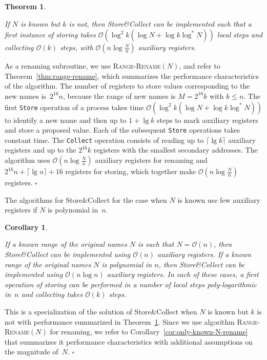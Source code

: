 \documentclass[11pt]{article}
\newcommand{\cO}{\mathcal{O}}
\newcommand{\qed}{\hfill $\square$ \smallbreak}
\newenvironment{proof}{\noindent{\bf Proof:}}{\qed}
\newtheorem{theorem}{Theorem}
\newtheorem{corollary}{Corollary}
\begin{document}
\begin{theorem}
\label{thm:collect-only-N-known}

If $N$ is known but $k$ is not, then Store\&Collect can be implemented such that a first instance of storing takes $\cO(\log^2 k (\log N + \log k\log^\ast N))$ local steps and collecting $\cO(k)$ steps, with $\cO(n\log\frac{N}{n})$ auxiliary registers.
\end{theorem}

\begin{proof}
As a renaming subroutine, we use  \textsc{Range-Rename}$(N)$, and refer to Theorem~\ref{thm:range-rename}, which summarizes the performance characteristics of the algorithm. 
The number of registers to store values corresponding to the new names is~$2^{16}n$, because the range of new names is $M=2^{16}k$ with $k\le n$.
The first \texttt{Store} operation of a process takes time $\cO(\log^2 k (\log N + \log k\log^\ast N))$ to identify a new name and then up to $1+\lg k$ steps to mark auxiliary registers and store a proposed value.
Each of the subsequent \texttt{Store} operations takes constant time.
The \texttt{Collect} operation consists of reading up to $\lceil \lg k\rceil$ auxiliary registers and up to the $2^{16} k$ registers with the smallest secondary addresses.
The algorithm uses $\cO(n\log\frac{N}{n})$ auxiliary registers for renaming and $2^{16} n + \lceil \lg n\rceil+16$ registers for storing, which together make $\cO(n\log\frac{N}{n})$ registers.
\end{proof}

The  algorithms for Store\&Collect for the case when $N$ is known use few auxiliary registers if $N$ is  polynomial in~$n$.



\begin{corollary}
\label{cor:store-collect-N-known}

If a known range of the original names $N$ is such that $N=\cO(n)$, then Store\&Collect can be implemented using $\cO(n)$ auxiliary registers.
If a known range of the original names $N$ is polynomial in $n$, then Store\&Collect can be implemented using $\cO(n\log n)$ auxiliary registers. 
In each of these cases, a first operation of storing can be performed in a number of local steps poly-logarithmic in~$n$ and collecting takes $\cO(k)$ steps.
\end{corollary}

\begin{proof}
This is a specialization of the solution of Store\&Collect when $N$ is known but $k$ is not with performance summarized in Theorem~\ref{thm:collect-only-N-known}.
Since we use algorithm \textsc{Range-Rename}$(N)$ for renaming, we refer to Corollary~\ref{cor:only-known-N-rename} that summarizes it performance characteristics with additional assumptions on the magnitude of~$N$.
\end{proof}
\end{document}
